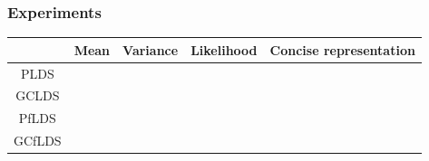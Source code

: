 \documentclass[16pt,presentation]{beamer}
\newcommand{\cmark}{\ding{51}}%
\newcommand{\xmark}{\ding{55}}%
\begin{document}
\begin{frame}
\frametitle{Experiments}
\begin{center}
\begin{tabular}{ ccccc } 
 \hline
  & Mean & Variance & Likelihood & \alert{Concise representation}\\
 \hline
 PLDS & \cmark & \xmark& \xmark &  \xmark  \\ 
 GCLDS &\cmark &\cmark &\cmark &  \xmark  \\ 
 \alert{PfLDS} & \cmark & \xmark& \xmark &   \cmark\\ 
 \alert{GCfLDS} &\cmark &\cmark &\cmark &  \cmark \\ 
 \hline
\end{tabular}
\end{center}
\end{frame}
\end{document}
